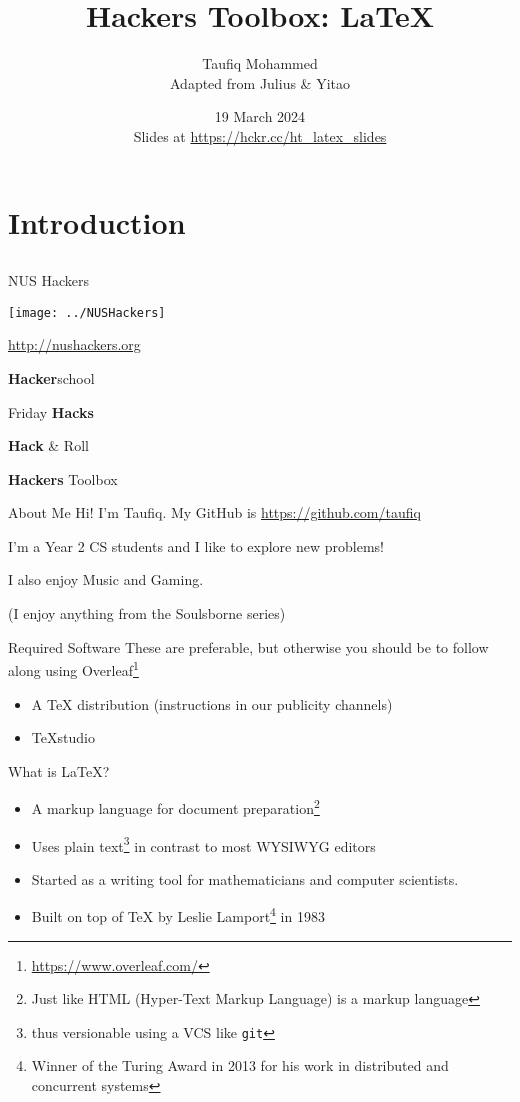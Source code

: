 \documentclass[12pt]{beamer}
\title{Hackers Toolbox: \LaTeX{}}
\author{Taufiq Mohammed \\ Adapted from Julius \& Yitao}
\date{19 March 2024 \\ Slides at \url{https://hckr.cc/ht_latex_slides}}
\begin{document}
\frame[plain]{\titlepage}

\section{Introduction}
\subsection{}

\begin{frame}{NUS Hackers}

  \begin{center}
    \texttt{[image: ../NUSHackers]}

    \url{http://nushackers.org}
  \end{center}

  \begin{center}
    \textbf{Hacker}school

    Friday \textbf{Hacks}

    \textbf{Hack} \& Roll

    \textbf{Hackers} Toolbox
  \end{center}

\end{frame}

\begin{frame}{About Me}
  Hi! I'm Taufiq. My GitHub is \url{https://github.com/taufiq}
  
  I'm a Year 2 CS students and I like to explore new problems!

  I also enjoy Music and Gaming.

    {\tiny (I enjoy anything from the Soulsborne series)}
\end{frame}

\begin{frame}{Required Software}
  These are preferable, but otherwise you should be to follow along using Overleaf\footnote{\url{https://www.overleaf.com/}}
  \begin{itemize}
    \item A \TeX{} distribution (instructions in our publicity channels)
    \item TeXstudio
  \end{itemize}
\end{frame}

\begin{frame}{What is \LaTeX{}?}
  \begin{itemize}
    \item A markup language for document preparation\footnote{Just like HTML (Hyper-Text Markup Language) is a markup language}
    \item Uses plain text\footnote{thus versionable using a VCS like \texttt{git}} in contrast to most WYSIWYG editors
    \item Started as a writing tool for mathematicians and computer scientists.
    \item Built on top of \TeX{} by Leslie Lamport\footnote{Winner of the Turing Award in 2013 for his work in distributed and concurrent systems} in 1983
  \end{itemize}
\end{frame}
\end{document}
